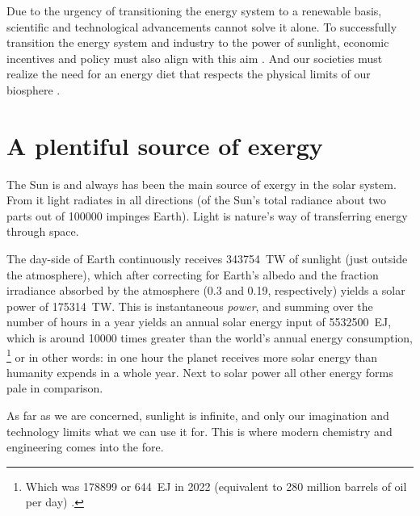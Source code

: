 \documentclass[webedition,openright,titles,swedish,english]{LuaUUThesis}\usepackage[]{graphicx}\usepackage[]{xcolor}
\newcommand{\seemore}[1]{\marginnote{%
   \noindent\tikz[baseline=(current bounding box.south)]%
   \node[text width=0.8\marginparwidth,align=left,rectangle,rounded corners,fill=blondsvag,font=\scriptsize]{#1};%
}}
\begin{document}
Due to the urgency of transitioning the energy system to a renewable basis,
scientific and technological advancements cannot solve it alone.
To successfully transition the energy system and industry to the power of sunlight,
economic incentives and policy must also align with this aim \cite{Nordhaus1972,Nordhaus1994,IRENA2019}.
And our societies must realize the need for an energy diet that respects
the physical limits of our biosphere \cite{Persson2022,Meadows1972}.




\section{A plentiful source of exergy}
\label{intro:solar-spectrum}


The Sun is and always has been the main source of exergy in the solar system.
From it light radiates in all directions (of the Sun's total radiance about
two parts out of \num{100000} impinges Earth).
Light is nature's way of transferring energy through space.%
%





The day-side of Earth continuously receives
\qty{343754}{\tera\watt}
of sunlight (just outside the atmosphere), which after correcting
for Earth's albedo and the fraction irradiance absorbed by the atmosphere
(0.3 and 0.19, respectively)
yields a solar power of
\qty{175314}{\tera\watt}.%
\seemore{\cref{photoec}}%
This is instantaneous \emph{power}, and summing over the number of hours in a year
yields an annual solar energy input of
\qty{ 5532500}{\exa\joule},
which is around \num{10000} times greater than the world's annual energy consumption,%
\footnote{%
   Which was \qty{178899}{\TWh} or \qty{644}{\exa\joule} in 2022
   (equivalent to 280 million barrels of oil per day) \cite{Wolfson2018}.
}
or in other words: in one hour the planet receives more solar energy than humanity
expends in a whole year.
Next to solar power all other energy forms pale in comparison.

As far as we are concerned, sunlight is infinite, and only our imagination and
technology limits what we can use it for.
This is where modern chemistry and engineering comes into the fore.

%
\end{document}
